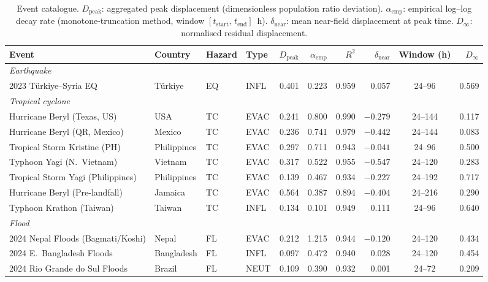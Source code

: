 \documentclass[11pt]{article}
\newcommand{\dnear}{\delta_{\mathrm{near}}}
\newcommand{\dpeak}{D_{\mathrm{peak}}}
\newcommand{\aemp}{\alpha_{\mathrm{emp}}}
\begin{document}
\begin{table}[h]
\centering
\caption{Event catalogue.  $\dpeak$: aggregated peak displacement
(dimensionless population ratio deviation).  $\aemp$: empirical
log--log decay rate (monotone-truncation method, window
$[t_{\mathrm{start}},\,t_{\mathrm{end}}]$~h).
$\dnear$: mean near-field displacement at peak time.
$D_\infty$: normalised residual displacement.}
\label{tab:events}
\small
\setlength{\tabcolsep}{4pt}
\begin{tabular}{@{}llllrrrrcr@{}}
\toprule
Event & Country & Hazard & Type
  & $\dpeak$ & $\aemp$ & $R^2$ & $\dnear$
  & Window (h) & $D_\infty$ \\
\midrule
\multicolumn{10}{l}{\textit{Earthquake}} \\[2pt]
2023 T\"{u}rkiye--Syria EQ    & T\"{u}rkiye & EQ & INFL & 0.401 & 0.223 & 0.959 &  0.057 & 24--96  & 0.569 \\
\midrule
\multicolumn{10}{l}{\textit{Tropical cyclone}} \\[2pt]
Hurricane Beryl (Texas, US)       & USA         & TC & EVAC & 0.241 & 0.800 & 0.990 & $-0.279$ & 24--144 & 0.117 \\
Hurricane Beryl (QR, Mexico)      & Mexico      & TC & EVAC & 0.236 & 0.741 & 0.979 & $-0.442$ & 24--144 & 0.083 \\
Tropical Storm Kristine (PH)      & Philippines & TC & EVAC & 0.297 & 0.711 & 0.943 & $-0.041$ & 24--96  & 0.500 \\
Typhoon Yagi (N.~Vietnam)         & Vietnam     & TC & EVAC & 0.317 & 0.522 & 0.955 & $-0.547$ & 24--120 & 0.283 \\
Tropical Storm Yagi (Philippines) & Philippines & TC & EVAC & 0.139 & 0.467 & 0.934 & $-0.227$ & 24--192 & 0.717 \\
Hurricane Beryl (Pre-landfall)    & Jamaica     & TC & EVAC & 0.564 & 0.387 & 0.894 & $-0.404$ & 24--216 & 0.290 \\
Typhoon Krathon (Taiwan)          & Taiwan      & TC & INFL & 0.134 & 0.101 & 0.949 &  0.111 & 24--96  & 0.640 \\
\midrule
\multicolumn{10}{l}{\textit{Flood}} \\[2pt]
2024 Nepal Floods (Bagmati/Koshi) & Nepal      & FL & EVAC & 0.212 & 1.215 & 0.944 & $-0.120$ & 24--120 & 0.434 \\
2024 E.~Bangladesh Floods         & Bangladesh & FL & INFL & 0.097 & 0.472 & 0.940 &  0.028 & 24--120 & 0.454 \\
2024 Rio Grande do Sul Floods     & Brazil     & FL & NEUT & 0.109 & 0.390 & 0.932 &  0.001 & 24--72  & 0.209 \\

\end{tabular}
\end{table}
\end{document}
